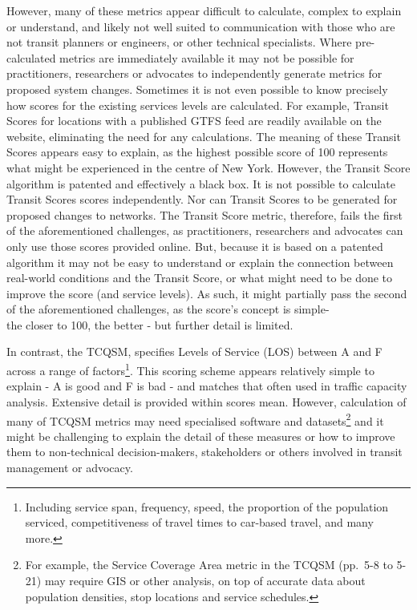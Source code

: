\documentclass[preprint, 3p,
authoryear]{elsarticle} %
\begin{document}
However, many of these metrics appear difficult to calculate, complex to
explain or understand, and likely not well suited to communication with
those who are not transit planners or engineers, or other technical
specialists. Where pre-calculated metrics are immediately available it
may not be possible for practitioners, researchers or advocates to
independently generate metrics for proposed system changes. Sometimes it
is not even possible to know precisely how scores for the existing
services levels are calculated. For example, Transit Scores for
locations with a published GTFS feed are readily available on the
\citet{WalkScore:2023tg} website, eliminating the need for any
calculations. The meaning of these Transit Scores appears easy to
explain, as the highest possible score of 100 represents what might be
experienced in the centre of New York. However, the Transit Score
algorithm is patented and effectively a black box. It is not possible to
calculate Transit Scores scores independently. Nor can Transit Scores to
be generated for proposed changes to networks. The Transit Score metric,
therefore, fails the first of the aforementioned challenges, as
practitioners, researchers and advocates can only use those scores
provided online. But, because it is based on a patented algorithm it may
not be easy to understand or explain the connection between real-world
conditions and the Transit Score, or what might need to be done to
improve the score (and service levels). As such, it might partially pass
the second of the aforementioned challenges, as the score's concept is
simple-\\
the closer to 100, the better - but further detail is limited.

In contrast, the TCQSM, specifies Levels of Service (LOS) between A and
F across a range of factors\footnote{ Including service span, frequency,
  speed, the proportion of the population serviced, competitiveness of
  travel times to car-based travel, and many more.}. This scoring scheme
appears relatively simple to explain - A is good and F is bad - and
matches that often used in traffic capacity analysis. Extensive detail
is provided within \citet{TCQSM:2013} scores mean. However, calculation
of many of TCQSM metrics may need specialised software and
datasets\footnote{ For example, the Service Coverage Area metric in the
  TCQSM (pp.~5-8 to 5-21) may require GIS or other analysis, on top of
  accurate data about population densities, stop locations and service
  schedules.} and it might be challenging to explain the detail of these
measures or how to improve them to non-technical decision-makers,
stakeholders or others involved in transit management or advocacy.
\end{document}
